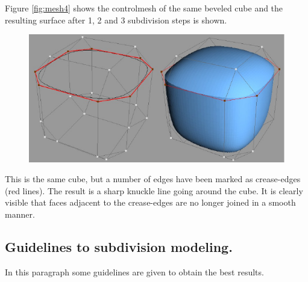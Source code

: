 \documentclass[12pt]{article}
\begin{document}
Figure \ref{fig:mesh4} shows the controlmesh of the same beveled cube
and the resulting surface after 1, 2 and 3 subdivision steps is shown.

\begin{figure}[h]
        \centering
        \includegraphics[width=15cm,natwidth=535,natheight=268]{figure6.png}
        \caption{}
        \label{fig:mesh5}
\end{figure}

This is the same cube, but a number of edges have been marked as
crease-edges (red lines). The result is a sharp knuckle line going
around the cube. It is clearly visible that faces adjacent to the
crease-edges are no longer joined in a smooth manner.

\subsection{Guidelines to subdivision modeling.} \label{guidelines}
In this paragraph some guidelines are given to obtain the best
results.
\end{document}
